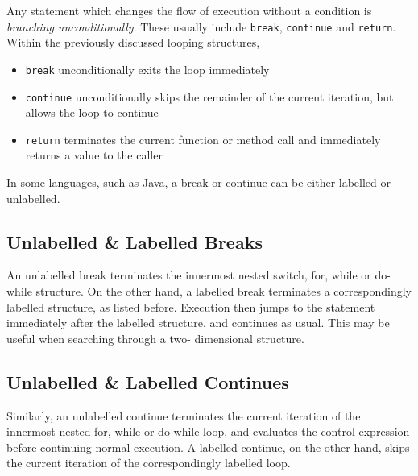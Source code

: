 Any statement which changes the flow of execution without a condition is \textit{branching unconditionally}. These usually
 include \verb`break`, \verb`continue` and \verb`return`. Within the previously discussed looping structures,
\begin{itemize}
  \item \verb`break` unconditionally exits the loop immediately
  \item \verb`continue` unconditionally skips the remainder of the current iteration, but allows the loop to continue
  \item \verb`return` terminates the current function or method call and immediately returns a value to the caller
\end{itemize}

In some languages, such as Java, a break or continue can be either labelled or unlabelled.

\subsection*{Unlabelled \& Labelled Breaks}

An unlabelled break terminates the innermost nested switch, for, while or do-while structure. On the other hand, a
 labelled break terminates a correspondingly labelled structure, as listed before. Execution then jumps to the statement
 immediately after the labelled structure, and continues as usual. This may be useful when searching through a two-
dimensional structure.

\subsection*{Unlabelled \& Labelled Continues}

Similarly, an unlabelled continue terminates the current iteration of the innermost nested for, while or do-while loop,
 and evaluates the control expression before continuing normal execution. A labelled continue, on the other hand, skips
 the current iteration of the correspondingly labelled loop.